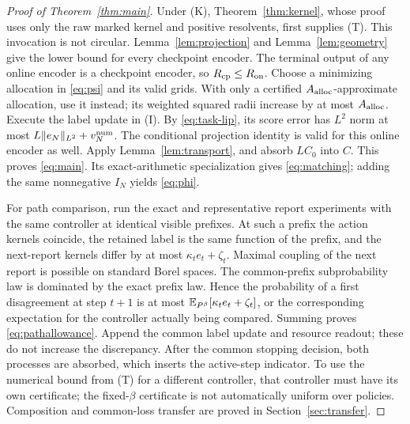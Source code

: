 \begin{proof}[Proof of Theorem~\ref{thm:main}]
Under \textup{(K)}, Theorem~\ref{thm:kernel}, whose proof uses only the raw marked kernel and positive resolvents, first supplies \textup{(T)}. This invocation is not circular. Lemma~\ref{lem:projection} and Lemma~\ref{lem:geometry} give the lower bound for every checkpoint encoder. The terminal output of any online encoder is a checkpoint encoder, so $R_{\mathrm{cp}}\le R_{\mathrm{on}}$. Choose a minimizing allocation in \eqref{eq:psi} and its valid grids. With only a certified $A_{\rm alloc}$-approximate allocation, use it instead; its weighted squared radii increase by at most $A_{\rm alloc}$. Execute the label update in \textup{(I)}. By \eqref{eq:task-lip}, its score error has $L^2$ norm at most $L\lVert e_N\rVert_{L^2}+v_N^{\rm num}$. The conditional projection identity is valid for this online encoder as well. Apply Lemma~\ref{lem:transport}, and absorb $LC_0$ into $C$. This proves \eqref{eq:main}. Its exact-arithmetic specialization gives \eqref{eq:matching}; adding the same nonnegative $I_N$ yields \eqref{eq:phi}.

For path comparison, run the exact and representative report experiments with the same controller at identical visible prefixes. At such a prefix the action kernels coincide, the retained label is the same function of the prefix, and the next-report kernels differ by at most $\kappa_te_t+\zeta_t$. Maximal coupling of the next report is possible on standard Borel spaces. The common-prefix subprobability law is dominated by the exact prefix law. Hence the probability of a first disagreement at step $t+1$ is at most $\mathbb E_{P^\beta}[\kappa_te_t+\zeta_t]$, or the corresponding expectation for the controller actually being compared. Summing proves \eqref{eq:pathallowance}. Append the common label update and resource readout; these do not increase the discrepancy. After the common stopping decision, both processes are absorbed, which inserts the active-step indicator. To use the numerical bound from \textup{(T)} for a different controller, that controller must have its own certificate; the fixed-$\beta$ certificate is not automatically uniform over policies. Composition and common-loss transfer are proved in Section~\ref{sec:transfer}.
\end{proof}

